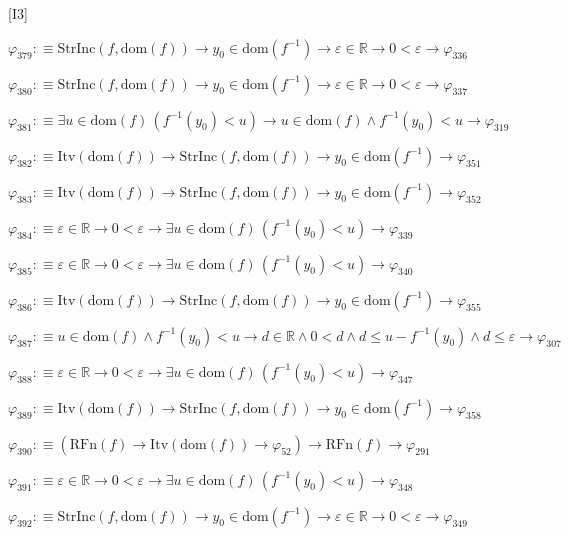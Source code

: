 \begin{fullproof}{[I3]}
\begin{abbrevlist}
\item $\varphi_{379} :\equiv \mathrm{StrInc}(f,\mathrm{dom}(f)) \to y_{0} \in \mathrm{dom}(f^{-1}) \to \varepsilon \in \mathbb{R} \to 0 < \varepsilon \to \varphi_{336}$
\item $\varphi_{380} :\equiv \mathrm{StrInc}(f,\mathrm{dom}(f)) \to y_{0} \in \mathrm{dom}(f^{-1}) \to \varepsilon \in \mathbb{R} \to 0 < \varepsilon \to \varphi_{337}$
\item $\varphi_{381} :\equiv \exists u \in \mathrm{dom}(f)\,(f^{-1}(y_{0}) < u) \to u \in \mathrm{dom}(f) \land f^{-1}(y_{0}) < u \to \varphi_{319}$
\item $\varphi_{382} :\equiv \mathrm{Itv}(\mathrm{dom}(f)) \to \mathrm{StrInc}(f,\mathrm{dom}(f)) \to y_{0} \in \mathrm{dom}(f^{-1}) \to \varphi_{351}$
\item $\varphi_{383} :\equiv \mathrm{Itv}(\mathrm{dom}(f)) \to \mathrm{StrInc}(f,\mathrm{dom}(f)) \to y_{0} \in \mathrm{dom}(f^{-1}) \to \varphi_{352}$
\item $\varphi_{384} :\equiv \varepsilon \in \mathbb{R} \to 0 < \varepsilon \to \exists u \in \mathrm{dom}(f)\,(f^{-1}(y_{0}) < u) \to \varphi_{339}$
\item $\varphi_{385} :\equiv \varepsilon \in \mathbb{R} \to 0 < \varepsilon \to \exists u \in \mathrm{dom}(f)\,(f^{-1}(y_{0}) < u) \to \varphi_{340}$
\item $\varphi_{386} :\equiv \mathrm{Itv}(\mathrm{dom}(f)) \to \mathrm{StrInc}(f,\mathrm{dom}(f)) \to y_{0} \in \mathrm{dom}(f^{-1}) \to \varphi_{355}$
\item $\varphi_{387} :\equiv u \in \mathrm{dom}(f) \land f^{-1}(y_{0}) < u \to d \in \mathbb{R} \land 0 < d \land d \leq u - f^{-1}(y_{0}) \land d \leq \varepsilon \to \varphi_{307}$
\item $\varphi_{388} :\equiv \varepsilon \in \mathbb{R} \to 0 < \varepsilon \to \exists u \in \mathrm{dom}(f)\,(f^{-1}(y_{0}) < u) \to \varphi_{347}$
\item $\varphi_{389} :\equiv \mathrm{Itv}(\mathrm{dom}(f)) \to \mathrm{StrInc}(f,\mathrm{dom}(f)) \to y_{0} \in \mathrm{dom}(f^{-1}) \to \varphi_{358}$
\item $\varphi_{390} :\equiv (\mathrm{RFn}(f) \to \mathrm{Itv}(\mathrm{dom}(f)) \to \varphi_{52}) \to \mathrm{RFn}(f) \to \varphi_{291}$
\item $\varphi_{391} :\equiv \varepsilon \in \mathbb{R} \to 0 < \varepsilon \to \exists u \in \mathrm{dom}(f)\,(f^{-1}(y_{0}) < u) \to \varphi_{348}$
\item $\varphi_{392} :\equiv \mathrm{StrInc}(f,\mathrm{dom}(f)) \to y_{0} \in \mathrm{dom}(f^{-1}) \to \varepsilon \in \mathbb{R} \to 0 < \varepsilon \to \varphi_{349}$

\end{abbrevlist}
\end{fullproof}

